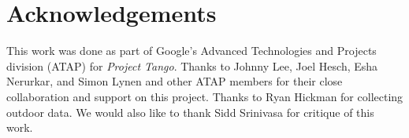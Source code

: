 \documentclass[conference,10pt]{IEEEtran}
\begin{document}
\section*{Acknowledgements}
This work was done as part of Google's Advanced Technologies and Projects
division (ATAP) for \emph{Project Tango}. Thanks to Johnny Lee, Joel Hesch, Esha
Nerurkar, and Simon Lynen and other ATAP members for their close collaboration
and support on this project. Thanks to Ryan Hickman for collecting outdoor data.
We would also like to thank Sidd Srinivasa for critique of this work.


 
\end{document}
